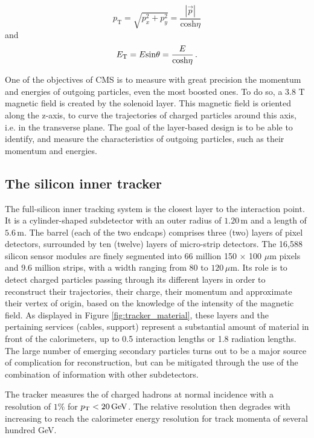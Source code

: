 \begin{equation}
    p_{\mathrm{T}} = \sqrt{p_{x}^2 + p_{y}^2} = \frac{|\Vec{p}|}{\mathrm{cosh} \eta}
\end{equation}
and 
\begin{equation}
    E_{\mathrm{T}} = E \mathrm{sin} \theta = \frac{E}{\mathrm{cosh} \eta} \mend
\end{equation}

One of the objectives of CMS is to measure with great precision the momentum and energies of outgoing particles, even the most boosted ones. To do so, a 3.8 T magnetic field is created by the solenoid layer. This magnetic field is oriented along the z-axis, to curve the trajectories of charged particles around this axis, i.e. in the transverse plane. The goal of the layer-based design is to be able to identify, and measure the characteristics of outgoing particles, such as their momentum and energies.

\subsection{The silicon inner tracker}

The full-silicon inner tracking system \cite{Karimaki:368412,CERN-LHCC-2000-016} is the closest layer to the interaction point. It is a cylinder-shaped subdetector with an outer radius of $1.20\,\mathrm{m}$ and a length of $5.6\,\mathrm{m}$. The barrel (each of the two endcaps) comprises three (two) layers of pixel detectors, surrounded by ten (twelve) layers of micro-strip detectors. The 16,588 silicon sensor modules are finely segmented into 66 million 150 $\times$ 100 $\mu$m pixels and 9.6 million strips, with a width ranging from 80 to $120\,\mu\mathrm{m}$. Its role is to detect charged particles passing through its different layers in order to reconstruct their trajectories, their charge, their momentum and approximate their vertex of origin, based on the knowledge of the intensity of the magnetic field. As displayed in Figure \ref{fig:tracker_material}, these layers and the pertaining services (cables, support) represent a substantial amount of material in front of the calorimeters, up to 0.5 interaction lengths or 1.8 radiation lengths. The large number of emerging secondary particles turns out to be a major source of complication for reconstruction, but can be mitigated through the use of the combination of information with other subdetectors.

The tracker measures the \pt of charged hadrons at normal incidence with a resolution of $1\%$ for $p_{\mathrm{T}} < 20\,\mathrm{GeV}$. The relative resolution then degrades with increasing \pt to reach the calorimeter energy resolution for track momenta of several hundred GeV.

